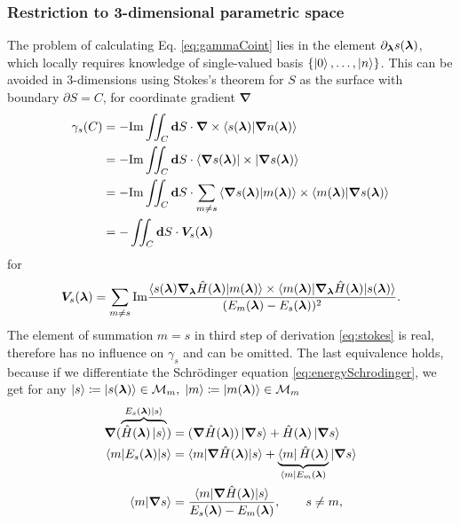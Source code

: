\subsubsection{Restriction to 3-dimensional parametric space}
The problem of calculating Eq. \ref{eq:gammaCoint} lies in the element $\partial_{\bm\lambda} s({\bm\lambda})$, which locally requires knowledge of single-valued basis $\{\ket{0},\dots, \ket{n}\}$. This can be avoided in 3-dimensions using Stokes's theorem for $S$ as the surface with boundary $\partial S=C$, for coordinate gradient $\bm \nabla$
\begin{equation}
    \begin{split}
        \gamma_s(C) &= -\textrm{Im} \iint_C \bm{\mathrm{d}} S \cdot \bm \nabla \times \braket{s({\bm\lambda})|\bm \nabla n({\bm\lambda})}\\
         &= -\textrm{Im} \iint_C \bm{\mathrm{d}} S \cdot \braket{\bm \nabla s({\bm\lambda})|\times|\bm \nabla s({\bm\lambda})}\\
        &= -\textrm{Im} \iint_C \bm{\mathrm{d}} S \cdot \sum_{m\neq s} \braket{\bm \nabla s({\bm\lambda})|m({\bm\lambda})}\times \braket{m({\bm\lambda})|\bm \nabla s({\bm\lambda})}\\
        &= -\iint_C \bm{\mathrm{d}} S \cdot \bm V_s({\bm\lambda})
    \end{split}
    \label{eq:stokes}
\end{equation}
for 
\begin{equation}
    \bm V_s({\bm\lambda}) = \sum_{m\neq s} \textrm{Im} \frac{
            \braket{s({\bm\lambda})\bm \nabla_{\bm\lambda} \hat{H}({\bm\lambda}) |m({\bm\lambda})}\times \braket{m({\bm\lambda})|\bm \nabla_{\bm\lambda} \hat{H}({\bm\lambda})|s({\bm\lambda})}    
             }{
(E_m({\bm\lambda})-E_s({\bm\lambda}))^2
             }.
\end{equation}
The element of summation $m=s$ in third step of derivation \ref{eq:stokes} is real, therefore has no influence on $\gamma_s$ and can be omitted. The last equivalence holds, because if we differentiate the Schr\"odinger equation \ref{eq:energySchrodinger}, we get for any $\ket{s}\coloneqq \ket{s({\bm\lambda})}\in \mathcal{M}_m,\;\ket{m}\coloneqq \ket{m({\bm\lambda})}\in \mathcal{M}_m$
\begin{equation}
    \begin{split}
        \bm \nabla (\overbrace{\hat{H}({\bm\lambda})\ket{s}}^{E_s({\bm\lambda})\ket{s}})&= (\bm\nabla \hat{H}({\bm\lambda}))\ket{\bm \nabla s} +\hat{H}({\bm\lambda}) \ket{\bm \nabla s}\\
        \braket{m|E_s({\bm\lambda})|s}&= \braket{m|\bm \nabla \hat{H}({\bm\lambda})| s}+ \underbrace{\bra{m} \hat{H}({\bm\lambda})}_{\bra{m} E_m({\bm\lambda})} |\bm\nabla s\rangle \\
        \braket{m|\bm \nabla s}&=
        \frac{\braket{m|\bm \nabla \hat{H}({\bm\lambda}) |s}}
        { E_s({\bm\lambda})-E_m({\bm\lambda})}, \qquad s\neq m,
    \end{split}
\end{equation}

